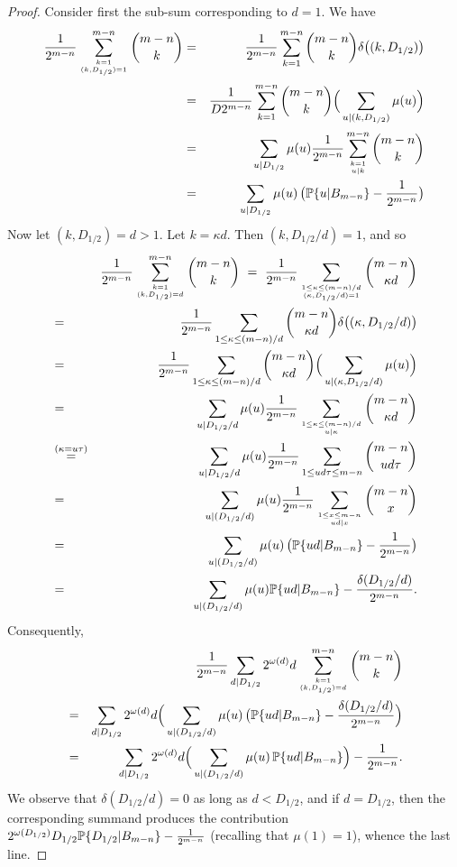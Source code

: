 \documentclass[11pt,draft,reqno]{amsart}
\theoremstyle{definition}
\theoremstyle{remarks}
\numberwithin{equation}{section}
\def \d{{\delta}}
\def \k{{\kappa}}
\def \o{{\omega}}
\def \m{{\mu}}
\def\P{{\mathcal P}}
\def\P{{\mathbb P}}
\begin{document}
\begin{proof}
 Consider first the sub-sum corresponding to $d=1$. We have  
\begin{eqnarray*}
 {1  \over  2^{  m-n }}
 \sum_{k=1\atop (k, D_{1/2})=1}^{m-n}   {{m-n}\choose {k}}
 &=&
 {1  \over   2^{  m-n }}
 \sum_{k=1}^{m-n}   {{m-n}\choose {k}}\d\big((k, D_{1/2})\big)
 \cr&=& 
 {1  \over D 2^{  m-n }}
 \sum_{k=1}^{m-n}   {{m-n}\choose {k}}\Big(\sum_{u|(k, D_{1/2} )}\m(u)\Big)
\cr&=& 
 \sum_{u|  D_{1/2} }\m(u)
 {1  \over   2^{  m-n }} \sum_{k=1\atop u|k}^{m-n}   {{m-n}\choose {k}}\cr&=& 
 \sum_{u|  D_{1/2} }\m(u)\,\big(\P\{u|B_{m-n}\}-{1  \over  2^{  m-n }}
\big)\end{eqnarray*}
Now let $(k, D_{1/2})=d>1$. Let $k=\k d$.
Then $(k,D_{1/2}/d)=1$, and so
\begin{eqnarray*}
& & {1  \over   2^{  m-n }}
 \sum_{k=1\atop (k, D_{1/2})=d}^{m-n}   {{m-n}\choose {k}}
\ = \ 
 {1  \over   2^{  m-n }}
 \sum_{1\le \k\le (m-n)/d\atop 
 (\k,D_{1/2}/d)=1}     {{m-n}\choose {\k d}}
\cr&=&
 {1  \over   2^{  m-n }}
 \sum_{1\le \k\le (m-n)/d}   {{m-n}\choose {\k d}}\d\big((\k, D_{1/2}/d)\big)
 \cr&=&{1  \over   2^{  m-n }}
 \sum_{1\le \k\le (m-n)/d}   {{m-n}\choose {\k d}}\Big(\sum_{u|(\k, D_{1/2}/d) }\m(u)\Big)
 \cr&=&\sum_{u|  D_{1/2}/d }\m(u)
 {1  \over   2^{  m-n }} \sum_{1\le \k\le (m-n)/d\atop u|\k}   {{m-n}\choose {\k d}}
    \cr &\buildrel{(\k = u\tau)}\over{=}& 
 \sum_{u|  D_{1/2} /d}\m(u)
 {1  \over   2^{  m-n }} \sum_{1\le ud\tau \le  m-n}     {{m-n}\choose {ud\tau}}
 \cr &=&
 \sum_{u|  (D_{1/2}/d ) }\m(u)
 {1  \over   2^{  m-n }} \sum_{1\le x \le  m-n\atop 
 ud|x}    {{m-n}\choose {x}}\cr&=& 
  \sum_{u|  (D_{1/2}/d )}\m(u)\,\big(\P\{ud|B_{m-n}\}-{1  \over  2^{  m-n }}
\big)
  \cr&=&
  \sum_{u|  (D_{1/2}/d )}\m(u) \P\{ud|B_{m-n}\}-{\d(D_{1/2}/d ) \over  2^{  m-n }}.\end{eqnarray*} 
Consequently,
 \begin{eqnarray*}
& &{1  \over  2^{  m-n }}\sum_{d| D_{1/2}} 2^{\o (d)}d
 \sum_{k=1\atop (k, D_{1/2})=d}^{m-n}   {{m-n}\choose {k}}  
\cr &=&
 \sum_{d| D_{1/2}} 2^{\o (d)}d
 \Big(\sum_{u|  (D_{1/2}/d )}\m(u)\,\big(\P\{ud|B_{m-n}\}-{\d(D_{1/2}/d )  \over  2^{  m-n }}\Big)
 \cr &=&
 \sum_{d| D_{1/2} } 2^{\o (d)}d
 \Big(\sum_{u|  (D_{1/2}/d )}\m(u)\, \P\{ud|B_{m-n}\}\Big)-{1  \over  2^{  m-n }} .
 \end{eqnarray*}
We observe   that $\d(D_{1/2}/d ) =0$ as long as $d< D_{1/2}$, and if $d=D_{1/2}$, then the corresponding summand   produces the contribution $2^{\o (D_{1/2})}D_{1/2}   \P\{ D_{1/2}|B_{m-n}\}-{1  \over  2^{  m-n }}$  (recalling that $\m(1)=1$), whence the last line. 

\end{proof}
\end{document}
